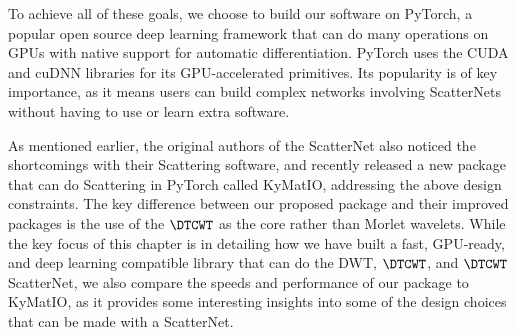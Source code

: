 To achieve all of these goals, we choose to build our software on PyTorch, 
a popular open source deep learning framework that can do many operations on
GPUs with native support for automatic differentiation. PyTorch uses the CUDA 
and cuDNN libraries for its GPU-accelerated primitives. Its popularity
is of key importance, as it means users can build complex networks involving
ScatterNets without having to use or learn extra software.

As mentioned earlier, the original authors of the ScatterNet also noticed the
shortcomings with their Scattering software, and recently released a new package
that can do Scattering in PyTorch called KyMatIO\cite{andreux_kymatio:_2018}, addressing the
above design constraints. The key difference between our proposed package and their
improved packages is the use of the $\DTCWT$ as the core rather than 
Morlet wavelets. While the key focus of this chapter is in detailing how we have
built a fast, GPU-ready, and deep learning compatible library that can do the
DWT, $\DTCWT$, and $\DTCWT$ ScatterNet, we also compare the speeds and performance
of our package to KyMatIO, as it provides some interesting
insights into some of the design choices that can be made with a ScatterNet.
